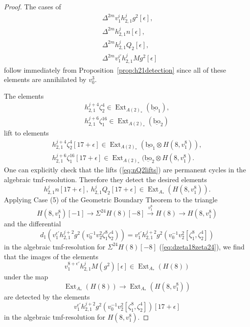 \documentclass[10pt]{amsart}
\newcommand{\ul}[1]{\underline{#1}}
\newcommand{\bo}{\mathrm{bo}}
\newcommand{\bou}{\ul{\bo}}
\theoremstyle{definition}
\numberwithin{equation}{section}
\numberwithin{figure}{section}
\DeclareMathOperator{\Ext}{Ext}
\begin{document}
\begin{proof}
The cases of
\begin{align*}
& \Delta^{2m} v_1^i h^j_{2,1} g^2[\epsilon], \\
& \Delta^{2m} h_{2,1}^j n[\epsilon], \\
& \Delta^{2m} h_{2,1}^j Q_2[\epsilon], \\
& \Delta^{2m} v_1^{i'} h^j_{2,1} Mg^2[\epsilon]
\end{align*}
follow immediately from Proposition~\ref{prop:h21detection} since all of these elements are annihilated by $v_0^3$.

The elements
\begin{equation*}
\begin{split}
h^{j+4}_{2,1} \zeta_2^4 \in \Ext_{A(2)_*}(\bou_1), \\
h^{j+6}_{2,1} \zeta_1^{16} \in \Ext_{A(2)_*}(\bou_2)
\end{split}
\end{equation*}
lift to elements
\begin{equation}\label{eq:nQ2lifts}
\begin{split}
h^{j+4}_{2,1} \zeta_2^4[17 + \epsilon] \in \Ext_{A(2)_*}(\bou_1 \otimes H(8,v_1^8)), \\
h^{j+6}_{2,1} \zeta_1^{16}[17+\epsilon] \in \Ext_{A(2)_*}(\bou_2 \otimes H(8,v_1^8).
\end{split}
\end{equation}
One can explicitly check that the lifts (\ref{eq:nQ2lifts}) are permanent cycles in the algebraic tmf-resolution.  Therefore they detect the desired elements
$$ h_{2,1}^j n[17 + \epsilon], \: h^j_{2,1} Q_2[17+\epsilon] \in 
\Ext_{A_*}(H(8,v_1^8)). $$
Applying Case (5) of the Geometric Boundary Theorem \cite[Lem.A.4.1]{goodehp}
to the triangle
$$ H(8,v_1^8)[-1] \rightarrow \Sigma^{24} H(8)[-8] \xrightarrow{v_1^8} H(8) \rightarrow H(8,v_1^8) $$
and the differential
$$ d_1(v_1^{\epsilon'}h^{j+2}_{2,1}g^2(v_0^{-1}v_2^2\zeta_1^8\zeta_2^4))
= v_1^{\epsilon'}h^{j+2}_{2,1}g^2(v_0^{-1}v_2^2[\zeta_1^8,\zeta_2^4]) $$
in the algebraic tmf-resolution for $\Sigma^{24}H(8)[-8]$  (\ref{eq:dzeta18zeta24}), we find that
the images of the elements
$$ v_1^{8 + \epsilon'} h_{2,1}^j M(g^2)[\epsilon] \in \Ext_{A_*}(H(8)) $$
under the map
$$ \Ext_{A_*}(H(8)) \rightarrow \Ext_{A_*}(H(8,v_1^8)) $$
are detected by the elements
$$ v_1^{\epsilon'}h^{j+2}_{2,1}g^2(v_0^{-1}v_2^2[\zeta_1^8,\zeta_2^4])[17+\epsilon] $$
in the algebraic tmf-resolution for $H(8,v_1^8)$.
\end{proof}
\end{document}
